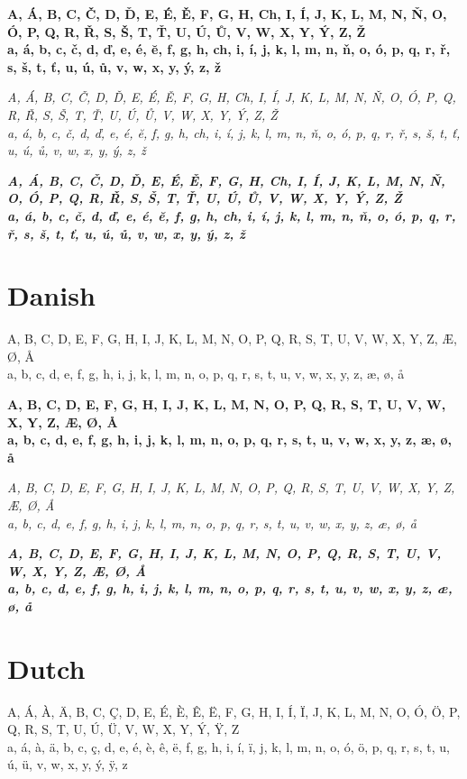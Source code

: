 \documentclass[12pt]{article}
\begin{document}
\textbf{
A, Á, B, C, Č, D, Ď, E, É, Ě, F, G, H, Ch, I, Í, J, K, L, M, N, Ň, O, Ó, P, Q, R, Ř, S, Š, T, Ť, U, Ú, Ů, V, W, X, Y, Ý, Z, Ž \\
a, á, b, c, č, d, ď, e, é, ĕ, f, g, h, ch, i, í, j, k, l, m, n, ň, o, ó, p, q, r, ř, s, š, t, ť, u, ú, ů, v, w, x, y, ý, z, ž
}

\textit{
A, Á, B, C, Č, D, Ď, E, É, Ě, F, G, H, Ch, I, Í, J, K, L, M, N, Ň, O, Ó, P, Q, R, Ř, S, Š, T, Ť, U, Ú, Ů, V, W, X, Y, Ý, Z, Ž \\
a, á, b, c, č, d, ď, e, é, ĕ, f, g, h, ch, i, í, j, k, l, m, n, ň, o, ó, p, q, r, ř, s, š, t, ť, u, ú, ů, v, w, x, y, ý, z, ž
}

\textbf{\textit{
A, Á, B, C, Č, D, Ď, E, É, Ě, F, G, H, Ch, I, Í, J, K, L, M, N, Ň, O, Ó, P, Q, R, Ř, S, Š, T, Ť, U, Ú, Ů, V, W, X, Y, Ý, Z, Ž \\
a, á, b, c, č, d, ď, e, é, ĕ, f, g, h, ch, i, í, j, k, l, m, n, ň, o, ó, p, q, r, ř, s, š, t, ť, u, ú, ů, v, w, x, y, ý, z, ž
}}


\section{Danish}
A, B, C, D, E, F, G, H, I, J, K, L, M, N, O, P, Q, R, S, T, U, V, W, X, Y, Z, Æ, Ø, Å \\
a, b, c, d, e, f, g, h, i, j, k, l, m, n, o, p, q, r, s, t, u, v, w, x, y, z, æ, ø, å

\textbf{
A, B, C, D, E, F, G, H, I, J, K, L, M, N, O, P, Q, R, S, T, U, V, W, X, Y, Z, Æ, Ø, Å \\
a, b, c, d, e, f, g, h, i, j, k, l, m, n, o, p, q, r, s, t, u, v, w, x, y, z, æ, ø, å
}

\textit{
A, B, C, D, E, F, G, H, I, J, K, L, M, N, O, P, Q, R, S, T, U, V, W, X, Y, Z, Æ, Ø, Å \\
a, b, c, d, e, f, g, h, i, j, k, l, m, n, o, p, q, r, s, t, u, v, w, x, y, z, æ, ø, å
}

\textbf{\textit{
A, B, C, D, E, F, G, H, I, J, K, L, M, N, O, P, Q, R, S, T, U, V, W, X, Y, Z, Æ, Ø, Å \\
a, b, c, d, e, f, g, h, i, j, k, l, m, n, o, p, q, r, s, t, u, v, w, x, y, z, æ, ø, å
}}


\clearpage
\section{Dutch}
A, Á, À, Ä, B, C, Ç, D, E, É, È, Ê, Ë, F, G, H, I, Í, Ï, J, K, L, M, N, O, Ó, Ö, P, Q, R, S, T, U, Ú, Ü, V, W, X, Y, Ý, Ÿ, Z \\
a, á, à, ä, b, c, ç, d, e, é, è, ê, ë, f, g, h, i, í, ï, j, k, l, m, n, o, ó, ö, p, q, r, s, t, u, ú, ü, v, w, x, y, ý, ÿ, z
\end{document}
